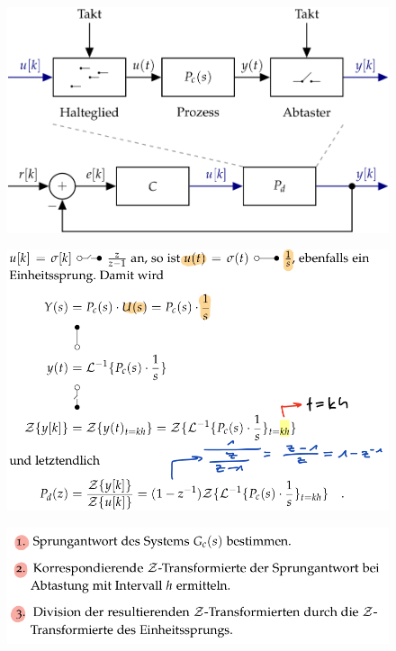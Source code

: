 \documentclass[
  10pt,
  a4paper,
  twocolumn]{article}
\numberwithin{equation}{section}
\begin{document}
\begin{figure}[H]

{\centering \includegraphics{images/paste-60.png}

}

\end{figure}

\begin{figure}[H]

{\centering \includegraphics{images/paste-62.png}

}

\end{figure}

\begin{figure}[H]

{\centering \includegraphics{images/paste-63.png}

}

\end{figure}
\end{document}
